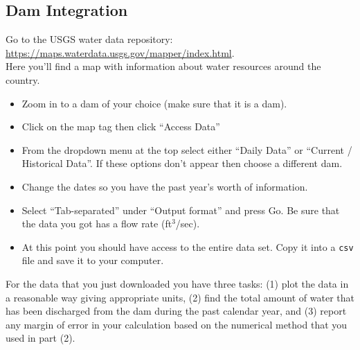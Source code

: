 \subsection{Dam Integration}
Go to the USGS water data repository: \\
\href{https://maps.waterdata.usgs.gov/mapper/index.html}{https://maps.waterdata.usgs.gov/mapper/index.html}.\\
Here you'll find a map with information about water resources around the country.
\begin{itemize}
    \item Zoom in to a dam of your choice (make sure that it is a dam).
    \item Click on the map tag then click ``Access Data''
    \item From the dropdown menu at the top select either ``Daily Data'' or ``Current
        / Historical Data''.  If these options don't appear then choose a different
        dam.
    \item Change the dates so you have the past year's worth of information.
    \item Select ``Tab-separated'' under ``Output format'' and press Go.  Be sure that
        the data you got has a flow rate (ft$^3$/sec).
    \item At this point you should have access to the entire data set.  Copy it into a
        \texttt{csv} file and save it to your computer.
\end{itemize}
For the data that you just downloaded you have three tasks: (1) plot the data in a
reasonable way giving appropriate units, (2) find the total amount of water that
has been discharged from the dam during the past calendar year, and (3) report any
margin of error in your calculation based on the numerical method that you used in
part (2).

